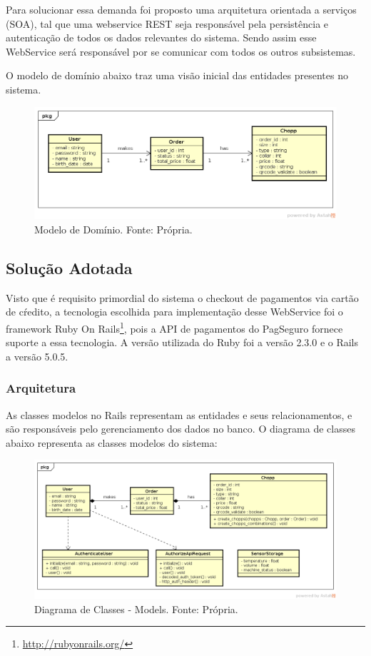 Para solucionar essa demanda foi proposto uma arquitetura orientada a serviços
(SOA), tal que uma webservice REST seja responsável pela persistência e autenticação de todos os
dados relevantes do sistema. Sendo assim esse WebService será responsável por se comunicar com
todos os outros subsistemas.

O modelo de domínio abaixo traz uma visão inicial das entidades presentes no sistema.

\begin{figure}[H]
    \centering
    \includegraphics[scale= 0.5]{figuras/modelo-dominio.png}
    \caption{Modelo de Domínio. Fonte: Própria.}
    \label{modelagem}
\end{figure}

\subsection{Solução Adotada}

Visto que é requisito primordial do sistema o checkout de pagamentos via cartão de cŕedito, a
tecnologia escolhida para implementação desse WebService foi o framework 
Ruby On Rails\footnote{\url{http://rubyonrails.org/}}, pois a API de pagamentos do PagSeguro
fornece suporte a essa tecnologia. A versão utilizada do Ruby foi a versão 2.3.0 e o Rails a versão 5.0.5.

\subsubsection[Arquitetura]{Arquitetura}


As classes modelos no Rails representam as entidades e seus relacionamentos, e são responsáveis pelo gerenciamento dos dados
no banco. O diagrama de classes abaixo representa as classes modelos do sistema:

\begin{figure}[H]
    \centering
    \includegraphics[scale= 0.5]{figuras/diagrama-models.png}
    \caption{Diagrama de Classes - Models. Fonte: Própria.}
    \label{modelagem}
\end{figure}

